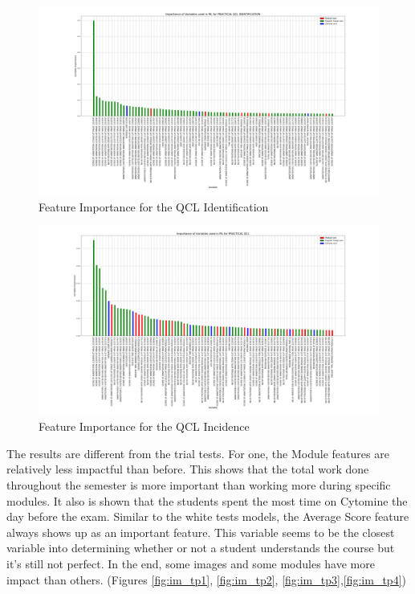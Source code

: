 \documentclass[a4paper,11pt]{report}
\numberwithin{figure}{section} %
\begin{document}
      \begin{figure}[H]
      \centering
      \includegraphics[width=.95\linewidth]{var_importance_PRACTICAL_QCL_IDENTIFICATION_2018-04-29_14_34_11.png}
      \caption{Feature Importance for the QCL Identification}
      \label{fig:var_tp3}
      \end{figure}
      
      \begin{figure}[H]
      \centering
      \includegraphics[width=.95\linewidth]{var_importance_PRACTICAL_QCL_2018-04-29_14_33_44.png}
      \caption{Feature Importance for the QCL Incidence}
      \label{fig:var_tp4}
      \end{figure}

The results are different from the trial tests.
For one, the Module features are relatively less impactful than before.
This shows that the total work done throughout the semester is more important than working more during specific modules.
It also is shown that the students spent the most time on Cytomine the day before the exam.%
Similar to the white tests models, the Average Score feature always shows up as an important feature.
This variable seems to be the closest variable into determining whether or not a student understands the course but it's still not perfect.
In the end, some images and some modules have more impact than others.  (Figures \ref{fig:im_tp1}, \ref{fig:im_tp2}, \ref{fig:im_tp3},\ref{fig:im_tp4})
\end{document}
